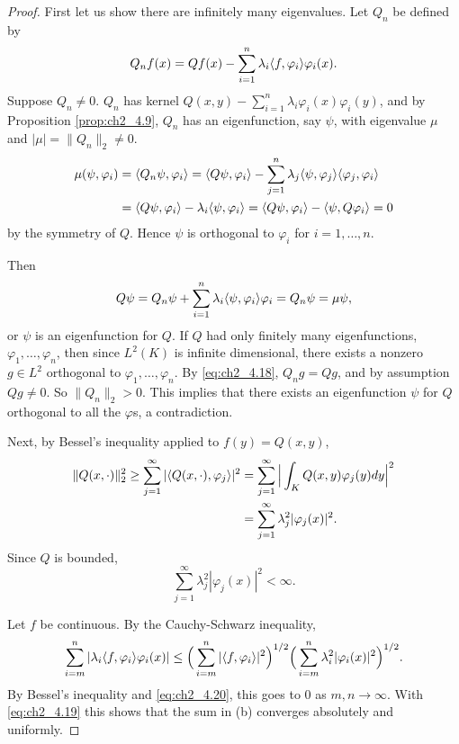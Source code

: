 \begin{proof}
First let us show there are infinitely many eigenvalues. Let $Q_n$ be defined by
\begin{equation}\label{eq:ch2_4.18}
    Q_nf(x) = Qf(x) - \sum_{i=1}^n \lambda_i\langle f, \varphi_i \rangle\varphi_i(x).
\end{equation}
Suppose $Q_n \neq 0$. $Q_n$ has kernel $Q(x,y) - \sum_{i=1}^n \lambda_i\varphi_i(x)\varphi_i(y)$, and by Proposition \ref{prop:ch2_4.9}, $Q_n$ has an eigenfunction, say $\psi$, with eigenvalue $\mu$ and $|\mu| = \|Q_n\|_2 \neq 0$.
\begin{align*}
    \mu(\psi, \varphi_i) &= \langle Q_n\psi, \varphi_i \rangle = \langle Q\psi, \varphi_i \rangle - \sum_{j=1}^n \lambda_j\langle \psi, \varphi_j \rangle\langle \varphi_j, \varphi_i \rangle \\
    &= \langle Q\psi, \varphi_i \rangle - \lambda_i\langle \psi, \varphi_i \rangle = \langle Q\psi, \varphi_i \rangle - \langle \psi, Q\varphi_i \rangle = 0
\end{align*}
by the symmetry of $Q$. Hence $\psi$ is orthogonal to $\varphi_i$ for $i = 1,\ldots,n$.

Then
\[
    Q\psi = Q_n\psi + \sum_{i=1}^n \lambda_i\langle \psi, \varphi_i \rangle\varphi_i = Q_n\psi = \mu\psi,
\]
or $\psi$ is an eigenfunction for $Q$. If $Q$ had only finitely many eigenfunctions, $\varphi_1,\ldots,\varphi_n$, then since $L^2(K)$ is infinite dimensional, there exists a nonzero $g \in L^2$ orthogonal to $\varphi_1,\ldots,\varphi_n$. By \eqref{eq:ch2_4.18}, $Q_ng = Qg$, and by assumption $Qg \neq 0$. So $\|Q_n\|_2 > 0$. This implies that there exists an eigenfunction $\psi$ for $Q$ orthogonal to all the $\varphi$s, a contradiction.

Next, by Bessel's inequality applied to $f(y) = Q(x,y)$,
\begin{align}\label{eq:ch2_4.19}
    \|Q(x,\cdot)\|_2^2 \geq \sum_{j=1}^{\infty} |\langle Q(x,\cdot), \varphi_j \rangle|^2 &= \sum_{j=1}^{\infty}\Big|\int_K Q(x,y)\varphi_j(y)dy\Big|^2 \\
    &= \sum_{j=1}^{\infty} \lambda_j^2|\varphi_j(x)|^2. \notag
\end{align}
Since $Q$ is bounded,
\begin{equation}\label{eq:ch2_4.20}
    \sum_{j=1}^{\infty} \lambda_j^2|\varphi_j(x)|^2 < \infty.
\end{equation}

Let $f$ be continuous. By the Cauchy-Schwarz inequality,
\[
    \sum_{i=m}^n |\lambda_i\langle f, \varphi_i \rangle\varphi_i(x)| \leq \Big(\sum_{i=m}^n |\langle f, \varphi_i \rangle|^2\Big)^{1/2}\Big(\sum_{i=m}^n \lambda_i^2|\varphi_i(x)|^2\Big)^{1/2}.
\]
By Bessel's inequality and \eqref{eq:ch2_4.20}, this goes to $0$ as $m,n \to \infty$. With \eqref{eq:ch2_4.19} this shows that the sum in (b) converges absolutely and uniformly.


\end{proof}
